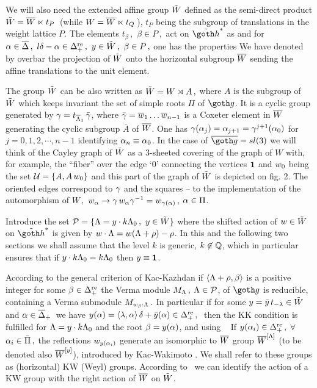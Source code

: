 We will also need the extended affine group $\tilde W$ 
defined as the semi-direct product
$\tilde W=\overline W\ltimes t_P\,$ (while $W=\overline W\ltimes t_Q\,$),  $t_P$ being
the subgroup of translations in the weight lattice $P$. The
elements $t_{\beta}\,,$ $\beta\in P\,,$ act on $\th^*$ as
%
\eqn{}
%
and for $ \alpha\in \overline\Delta\,,\,\, l\delta-\alpha\in \Delta^{\rm re}_+\,, \,\, y\in
\tilde W\,,\,\, \beta\in P\,,$ one has the properties
%
\eqn{}
%
We have denoted by overbar the projection of $\tilde W$ onto the
horizontal subgroup $\overline W$ sending the affine translations to the
unit element.

The group $\tilde W$ can be also written as $\tilde W=W\rtimes A\,,$ where
$A$ is the subgroup of $\tilde W$ which keeps invariant the set of
simple roots $\Pi$ of $\go$. It is a cyclic group generated by
$\gamma= t_{\overline{\Lambda}_1}\, \bar{\gamma}$, where $ \bar{\gamma}=\overline w_1\dots
\overline w_{n-1}$ is a Coxeter element in $\overline W$ generating  the 
cyclic subgroup $\bar{A}$ of $\overline W$.  One has
$\gamma(\alpha_j)=\alpha_{j+1}=\gamma^{j+1}(\alpha_0)$ for $j=0,1,2,\cdots, n-1$
identifying $\alpha_n\equiv\alpha_0$.  In the case of $\bgo=sl(3)$ we
will think of the Cayley graph of $\tilde W$ as a 3-sheeted covering
of the graph of $W$ with, for example, the ``fiber'' over the
edge `0' connecting the vertices ${\bf 1}$ and $w_0$ being the set
${\cal U}=\{A, A\,w_0\}$ and this part of the graph of $\tilde W$ is
depicted on fig. 2. The oriented edges correspond to $\gamma$ and
the squares -- to the implementation of the automorphism  of
$W\,,$ $w_{\alpha}\rightarrow \gamma \, w_{\alpha}
\gamma^{-1}=w_{\gamma(\alpha)}\,,$ $\alpha\in \Pi$. 


Introduce the set ${\cal P}=\{\Lambda= y\cdot k \Lambda_0\,, \,\, y\in \tilde W \}$
where the  shifted action of 
$w\in \tilde W$ 
on $\th^*$ is given by 
$w\cdot\Lambda=w(\Lambda+\rho)-\rho$.  In this and the following two
sections we shall assume that the level $k$ is generic, $k \not
\in {\Bbb Q}$, which in particular ensures that if $y\cdot k \Lambda_0=k
\Lambda_0$ then $y\equiv {\bf 1}$.

According to the general criterion of Kac-Kazhdan if
$\langle\Lambda+\rho,\beta\rangle $ is a positive integer for some $\beta\in
\Delta^{\rm re}_+$ the Verma module $M_{\Lambda}\,,$  $\Lambda\in {\cal P}$, of  $\go$ is
reducible, containing a Verma submodule $M_{w_{\beta}\cdot \Lambda}\,.$
In particular if for some $y=\bar y\, t_{-\lambda}\in \tilde W\,$ and $
\alpha\in \overline\Delta_+\, $ we have $y(\alpha)=\langle\lambda,\alpha \rangle\, \delta+\bar y(\alpha)\in
\Delta^{\rm re}_+\,,\ $ then the KK condition is fulfilled for  $\Lambda=y\cdot
k\Lambda_0$ and the root  $\beta=y(\alpha)$, and using \Ie\
% 
\eqn{}
%
If $y(\alpha_i)\in \Delta^{\rm re}_+\,,$ $\forall$ $\alpha_i\in \bar{\Pi}\,,$ the
reflections $w_{y(\alpha_i)}$ generate an  isomorphic to $\overline W$
group $\overline W^{[\Lambda]}$ (to be denoted also $\overline W^{[y]}$), introduced by
Kac-Wakimoto \KW. We shall refer to these groups as  (horizontal)
KW (Weyl) groups.  
According to  \Ia\ we can identify the action of a KW group with
the right action of $\overline W$ on $\tilde W$.


